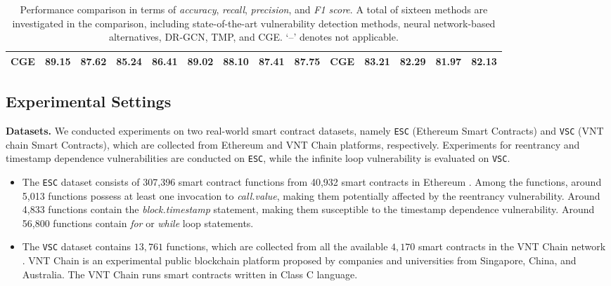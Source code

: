 \begin{table*}
{\begin{tabular}{cccccccccccccc}
\textbf{CGE} & \textbf{89.15} & \textbf{87.62} & \textbf{85.24} & \textbf{86.41} & \textbf{89.02} &  \textbf{88.10} & \textbf{87.41} & \textbf{87.75} & \textbf{CGE} & \textbf{83.21} & \textbf{82.29} & \textbf{81.97} & \textbf{82.13} \\
\bottomrule
\end{tabular}
}
\caption{ Performance comparison in terms of \emph{accuracy}, \emph{recall}, \emph{precision}, and \emph{F1 score}. A total of sixteen methods are investigated in the comparison, including state-of-the-art vulnerability detection methods, neural network-based alternatives, DR-GCN, TMP, and CGE. ‘--’ denotes not applicable.}
\label{Performance_comparison}
 \vspace{-1.8em}
\end{table*}

\vspace{-0.7em}
\subsection{Experimental Settings}
\textbf{Datasets.} We conducted experiments on two real-world smart contract datasets, namely \texttt{ESC} (Ethereum Smart Contracts) and \texttt{VSC} (VNT chain Smart Contracts), which are collected from Ethereum and VNT Chain platforms, respectively. Experiments for reentrancy and timestamp dependence vulnerabilities are conducted on \texttt{ESC}, while the infinite loop vulnerability is evaluated on \texttt{VSC}.
\begin{itemize}
\item The \texttt{ESC} dataset consists of  307,396 smart contract functions from  40,932 smart contracts in Ethereum \cite{Ethereum}. Among the functions, around 5,013 functions possess at least one invocation to \emph{call.value}, making them potentially affected by the reentrancy vulnerability. Around 4,833 functions contain the \emph{block.timestamp} statement, making them susceptible to the timestamp dependence vulnerability.  {Around 56,800 functions contain \emph{for} or \emph{while} loop statements}. 
\item The \texttt{VSC} dataset contains $13,761$ functions, which are collected from all the available $4,170$ smart contracts in the VNT Chain network \cite{Vntchain}. VNT Chain is an experimental public blockchain platform proposed by companies and universities from Singapore, China, and Australia.  The VNT Chain runs smart contracts written in Class C language.
\end{itemize}

